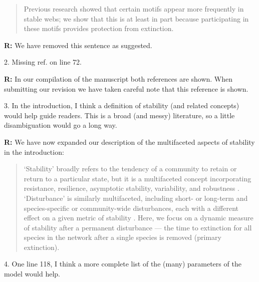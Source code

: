 \documentclass[12pt]{article}
\begin{document}
    \begin{quotation}
      Previous research showed that certain motifs appear more frequently in stable webs; we show that this is at least in part because participating in these motifs provides protection from extinction.
    \end{quotation}

    \smallskip

    \textbf{R:} We have removed this sentence as suggested.

    \smallskip

    2. Missing ref. on line 72.


    \smallskip

    \textbf{R:} In our compilation of the manuscript both references are shown. When submitting our revision we have taken careful note that this reference is shown.

    \smallskip

    3. In the introduction, I think a definition of stability (and related concepts) would help guide readers. This is a broad (and messy) literature, so a little disambiguation would go a long way.

    \smallskip

    \textbf{R:} We have now expanded our description of the multifaceted aspects of stability in the introduction:
    
    \begin{quotation}
    `Stability' broadly refers to the tendency of a community to retain or return to a particular state, but it is a multifaceted concept incorporating resistance, resilience, asymptotic stability, variability, and robustness \citep{Donohue2013}. `Disturbance' is similarly multifaceted, including short- or long-term and species-specific or community-wide disturbances, each with a different effect on a given metric of stability \citep{Donohue2013,Radchuck2019}.
    Here, we focus on a dynamic measure of stability after a permanent disturbance --- the time to extinction for all species in the network after a single species is removed (primary extinction).
    \end{quotation}
    
    \smallskip

    4. One line 118, I think a more complete list of the (many) parameters of the model would help.
\end{document}
